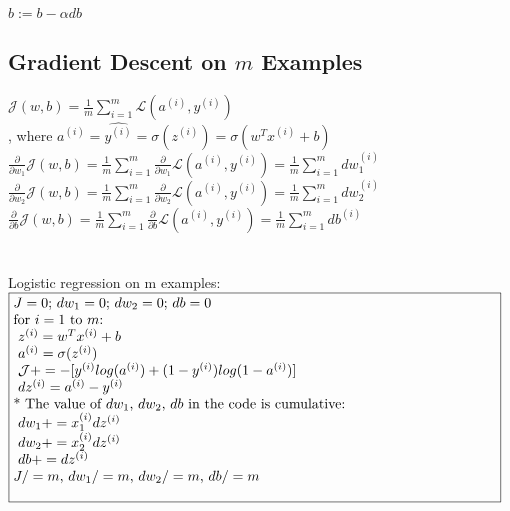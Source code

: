 \documentclass{article}
\begin{document}
$b := b - \alpha db $\\


\newpage
\subsection{Gradient Descent on $m$ Examples}

$\mathcal{J}(w,b) = \frac{1}{m}\sum_{i=1}^{m}\mathcal{L}(a^{(i)},y^{(i)})$\\

, where $a^{(i)} = \hat{y^{(i)}} = \sigma(z^{(i)}) = \sigma{(w^T x^{(i)} + b)}$\\

$\frac{\partial}{\partial w_1} \mathcal{J}(w,b) =\frac{1}{m}\sum_{i=1}^{m} \frac{\partial}{\partial w_1}\mathcal{L}(a^{(i)},y^{(i)})= \frac{1}{m}\sum_{i=1}^{m} dw_1^{(i)}$ \\

$\frac{\partial}{\partial w_2} \mathcal{J}(w,b) =\frac{1}{m}\sum_{i=1}^{m} \frac{\partial}{\partial w_2}\mathcal{L}(a^{(i)},y^{(i)})= \frac{1}{m}\sum_{i=1}^{m} dw_2^{(i)}$ \\

$\frac{\partial}{\partial b} \mathcal{J}(w,b) =\frac{1}{m}\sum_{i=1}^{m} \frac{\partial}{\partial b}\mathcal{L}(a^{(i)},y^{(i)})= \frac{1}{m}\sum_{i=1}^{m} db^{(i)}$ \\\\\\


Logistic regression on m examples:\\

$\noindent\fbox{%
    \parbox{\textwidth}{%
$J=0$; $dw_1 = 0$; $dw_2 = 0$; $db=0$\\

for $i=1$ to $m$:\\
$\indent$ $z^{(i)} = w^T x^{(i)} + b$\\
$\indent$ $a^{(i)} = \sigma(z^{(i)})$\\
$\indent$ $\mathcal{J} += -[y^{(i)} log(a^{(i)}) + (1-y^{(i)})log(1-a^{(i)})]$\\
$\indent$ $dz^{(i)} = a^{(i)}- y^{(i)}$\\

* The value of $dw_1$, $dw_2$, $db$ in the code is cumulative:\\
$\indent$ $dw_1 += x_1^{(i)}dz^{(i)}$\\
$\indent$ $dw_2 += x_2^{(i)}dz^{(i)}$\\
$\indent$ $db += dz^{(i)}$\\

$J/=m$,  $dw_1 /=m$,  $dw_2 /=m$,  $db /=m$\\

    }%
}$\\
\end{document}
